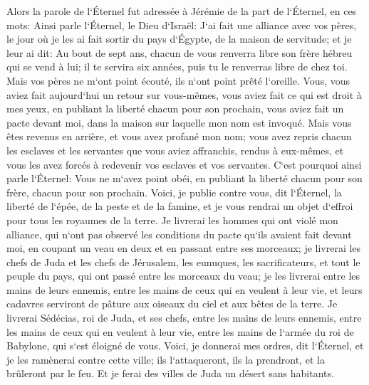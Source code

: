\verse Alors la parole de l`Éternel fut adressée à Jérémie de la part de l`Éternel, en ces mots: 
\verse Ainsi parle l`Éternel, le Dieu d`Israël: J`ai fait une alliance avec vos pères, le jour où je les ai fait sortir du pays d`Égypte, de la maison de servitude; et je leur ai dit: 
\verse Au bout de sept ans, chacun de vous renverra libre son frère hébreu qui se vend à lui; il te servira six années, puis tu le renverras libre de chez toi. Mais vos pères ne m`ont point écouté, ils n`ont point prêté l`oreille. 
\verse Vous, vous aviez fait aujourd`hui un retour sur vous-mêmes, vous aviez fait ce qui est droit à mes yeux, en publiant la liberté chacun pour son prochain, vous aviez fait un pacte devant moi, dans la maison sur laquelle mon nom est invoqué. 
\verse Mais vous êtes revenus en arrière, et vous avez profané mon nom; vous avez repris chacun les esclaves et les servantes que vous aviez affranchis, rendus à eux-mêmes, et vous les avez forcés à redevenir vos esclaves et vos servantes. 
\verse C`est pourquoi ainsi parle l`Éternel: Vous ne m`avez point obéi, en publiant la liberté chacun pour son frère, chacun pour son prochain. Voici, je publie contre vous, dit l`Éternel, la liberté de l`épée, de la peste et de la famine, et je vous rendrai un objet d`effroi pour tous les royaumes de la terre. 
\verse Je livrerai les hommes qui ont violé mon alliance, qui n`ont pas observé les conditions du pacte qu`ils avaient fait devant moi, en coupant un veau en deux et en passant entre ses morceaux; 
\verse je livrerai les chefs de Juda et les chefs de Jérusalem, les eunuques, les sacrificateurs, et tout le peuple du pays, qui ont passé entre les morceaux du veau; 
\verse je les livrerai entre les mains de leurs ennemis, entre les mains de ceux qui en veulent à leur vie, et leurs cadavres serviront de pâture aux oiseaux du ciel et aux bêtes de la terre. 
\verse Je livrerai Sédécias, roi de Juda, et ses chefs, entre les mains de leurs ennemis, entre les mains de ceux qui en veulent à leur vie, entre les mains de l`armée du roi de Babylone, qui s`est éloigné de vous. 
\verse Voici, je donnerai mes ordres, dit l`Éternel, et je les ramènerai contre cette ville; ils l`attaqueront, ils la prendront, et la brûleront par le feu. Et je ferai des villes de Juda un désert sans habitants. 

